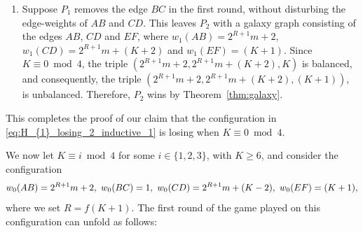 \documentclass[11pt,reqno]{amsart}
\theoremstyle{definition}
\theoremstyle{definition}
\begin{document}
\begin{enumerate}
\item Suppose $P_{1}$ removes the edge $BC$ in the first round, without disturbing the edge-weights of $AB$ and $CD$. This leaves $P_{2}$ with a galaxy graph consisting of the edges $AB$, $CD$ and $EF$, where $w_{1}(AB)=2^{R+1}m+2$, $w_{1}(CD)=2^{R+1}m+(K+2)$ and $w_{1}(EF)=(K+1)$. Since $K \equiv 0 \bmod 4$, the triple $(2^{R+1}m+2,2^{R+1}m+(K+2),K)$ is balanced, and consequently, the triple $(2^{R+1}m+2,2^{R+1}m+(K+2),(K+1))$, is unbalanced. Therefore, $P_{2}$ wins by Theorem~\ref{thm:galaxy}.
\end{enumerate}

This completes the proof of our claim that the configuration in \eqref{eq:H_{1}_losing_2_inductive_1} is losing when $K \equiv 0 \bmod 4$.

We now let $K \equiv i \bmod 4$ for some $i \in \{1,2,3\}$, with $K \geqslant 6$, and consider the configuration
\begin{align}
w_{0}(AB)=2^{R+1}m+2,\ w_{0}(BC)=1,\ w_{0}(CD)=2^{R+1}m+(K-2),\ w_{0}(EF)=(K+1),\label{eq:H_{1}_losing_2_inductive_2}
\end{align}
where we set $R=f(K+1)$. The first round of the game played on this configuration can unfold as follows:
\end{document}
